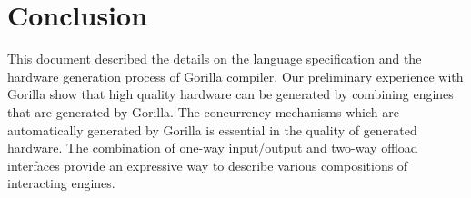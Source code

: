 \documentclass[a4paper, 12pt]{report}
\begin{document}
\section{Conclusion}
This document described the details on the language 
specification and the hardware generation process 
of Gorilla compiler. Our preliminary experience 
with Gorilla show that high quality hardware can 
be generated by combining engines that are generated 
by Gorilla. The concurrency mechanisms which are 
automatically generated by Gorilla is essential 
in the quality of generated hardware. The combination 
of one-way input/output and two-way offload interfaces 
provide an expressive way to describe various compositions 
of interacting engines. 


\end{document}
